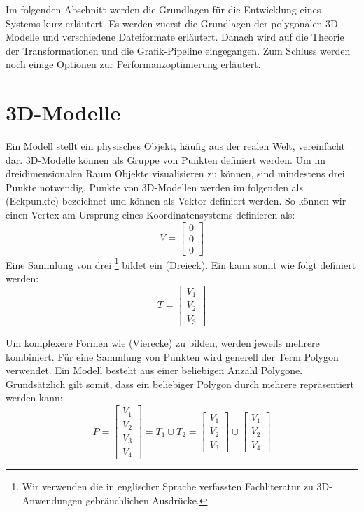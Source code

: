 
Im folgenden Abschnitt werden die Grundlagen für die Entwicklung eines -Systems kurz erläutert.
Es werden zuerst die Grundlagen der polygonalen 3D-Modelle und verschiedene Dateiformate erläutert. Danach wird auf die Theorie der Transformationen und die Grafik-Pipeline eingegangen. Zum Schluss werden noch einige Optionen zur Performanzoptimierung erläutert.

\section{3D-Modelle}
Ein Modell stellt ein physisches Objekt, häufig aus der realen Welt, vereinfacht dar.
3D-Modelle können als Gruppe von Punkten definiert werden.
Um im dreidimensionalen Raum Objekte visualisieren zu können, sind mindestens drei Punkte notwendig.
Punkte von 3D-Modellen werden im folgenden als  (Eckpunkte) bezeichnet und können als Vektor definiert werden.
So können wir einen Vertex am Ursprung eines Koordinatensystems definieren als:
$$ V =
\begin{bmatrix}
  0 \\
  0 \\
  0
\end{bmatrix}
$$
Eine Sammlung von drei \footnote{Wir verwenden die in englischer Sprache verfassten Fachliteratur zu 3D-Anwendungen gebräuchlichen Ausdrücke.} bildet ein  (Dreieck). Ein  kann somit wie folgt definiert werden:
$$ T =
\begin{bmatrix}
  V_1 \\
  V_2 \\
  V_3
\end{bmatrix}
$$

Um komplexere Formen wie  (Vierecke) zu bilden, werden jeweils mehrere  kombiniert. Für eine Sammlung von Punkten wird generell der Term Polygon verwendet.
Ein Modell besteht aus einer beliebigen Anzahl Polygone.
Grundsätzlich gilt somit, dass ein beliebiger Polygon durch mehrere  repräsentiert werden kann:
$$ P =
\begin{bmatrix}
  V_1 \\
  V_2 \\
  V_3 \\
  V_4
\end{bmatrix}
= T_1 \cup T_2
= \begin{bmatrix}
  V_1 \\
  V_2 \\
  V_3
\end{bmatrix}
\cup
\begin{bmatrix}
  V_1 \\
  V_2 \\
  V_4
\end{bmatrix}
$$

